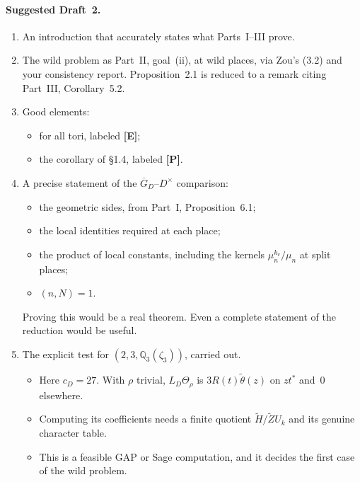 \documentclass[11pt]{article}
\newcommand{\GDb}{\overline G_D}
\newcommand{\tH}{\widetilde H}
\newcommand{\tZ}{\widetilde Z}
\theoremstyle{definition}
\begin{document}
\paragraph{Suggested Draft~2.}
\begin{enumerate}[label=\arabic*.]
\item An introduction that accurately states what Parts~I--III prove.
\item The wild problem as Part~II, goal~(ii), at wild places, via Zou's
(3.2) and your consistency report. Proposition~2.1 is reduced to a
remark citing Part~III, Corollary~5.2.
\item Good elements:
\begin{itemize}
\item [FK, \S3] for all tori, labeled \textbf{[E]};
\item the corollary of \S1.4, labeled \textbf{[P]}.
\end{itemize}
\item A precise statement of the $\GDb$--$D^\times$ comparison:
\begin{itemize}
\item the geometric sides, from Part~I, Proposition~6.1;
\item the local identities required at each place;
\item the product of local constants, including the kernels
$\mu_n^{k_v}/\mu_n$ at split places;
\item $(n,N)=1$.
\end{itemize}
Proving this would be a real theorem. Even a complete statement of the
reduction would be useful.
\item The explicit test for $(2,3,\mathbb Q_3(\zeta_3))$, carried out.
\begin{itemize}
\item Here $c_D=27$. With $\rho$ trivial, $L_D\Theta_\rho$ is
$3R(t)\tilde\theta(z)$ on $zt^*$ and~$0$ elsewhere.
\item Computing its coefficients needs a finite quotient
$\tH/\tZ U_k$ and its genuine character table.
\item This is a feasible GAP or Sage computation, and it decides the
first case of the wild problem.
\end{itemize}
\end{enumerate}
\end{document}
